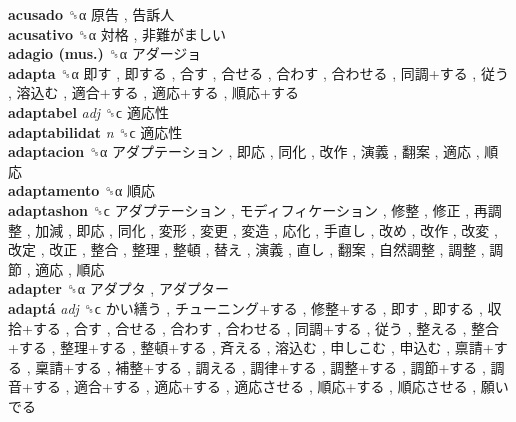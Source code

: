 \textbf{acusado} ␝α   原告 ,  告訴人   \\
\textbf{acusativo} ␝α   対格 ,  非難がましい   \\
\textbf{adagio (mus.)} ␝α   アダージョ   \\
\textbf{adapta} ␝α   即す ,  即する ,  合す ,  合せる ,  合わす ,  合わせる ,  同調+する ,  従う ,  溶込む ,  適合+する ,  適応+する ,  順応+する   \\
\textbf{adaptabel} \emph{adj}  ␝ϲ   適応性   \\
\textbf{adaptabilidat} \emph{n}  ␝ϲ   適応性   \\
\textbf{adaptacion} ␝α   アダプテーション ,  即応 ,  同化 ,  改作 ,  演義 ,  翻案 ,  適応 ,  順応   \\
\textbf{adaptamento} ␝α   順応   \\
\textbf{adaptashon} ␝ϲ   アダプテーション ,  モディフィケーション ,  修整 ,  修正 ,  再調整 ,  加減 ,  即応 ,  同化 ,  変形 ,  変更 ,  変造 ,  応化 ,  手直し ,  改め ,  改作 ,  改変 ,  改定 ,  改正 ,  整合 ,  整理 ,  整頓 ,  替え ,  演義 ,  直し ,  翻案 ,  自然調整 ,  調整 ,  調節 ,  適応 ,  順応   \\
\textbf{adapter} ␝α   アダプタ ,  アダプター   \\
\textbf{adaptá} \emph{adj}  ␝ϲ   かい繕う ,  チューニング+する ,  修整+する ,  即す ,  即する ,  収拾+する ,  合す ,  合せる ,  合わす ,  合わせる ,  同調+する ,  従う ,  整える ,  整合+する ,  整理+する ,  整頓+する ,  斉える ,  溶込む ,  申しこむ ,  申込む ,  禀請+する ,  稟請+する ,  補整+する ,  調える ,  調律+する ,  調整+する ,  調節+する ,  調音+する ,  適合+する ,  適応+する ,  適応させる ,  順応+する ,  順応させる ,  願いでる   \\
